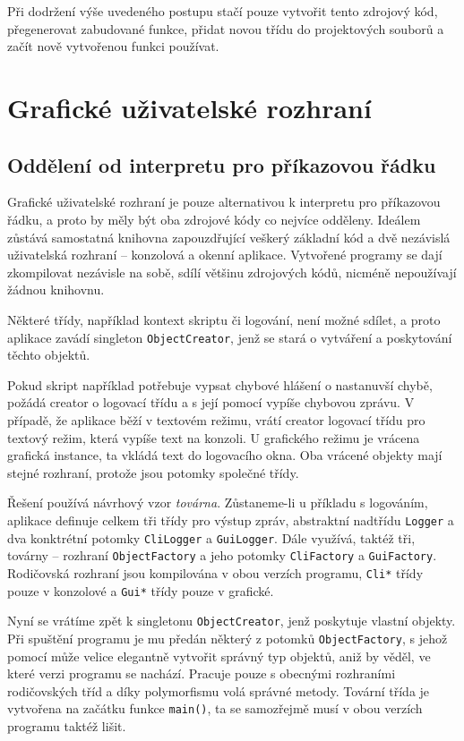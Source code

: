 \documentclass[11pt,twoside,a4paper]{book}
\begin{document}
Při dodržení výše uvedeného postupu stačí pouze vytvořit tento zdrojový kód, přegenerovat zabudované funkce, přidat novou třídu do projektových souborů a začít nově vytvořenou funkci používat.


\section{Grafické uživatelské rozhraní}

\subsection{Oddělení od interpretu pro příkazovou řádku}
\label{oddeleni_od_interpretu_pro_prikazovou_radku}

Grafické uživatelské rozhraní je pouze alternativou k interpretu pro příkazovou řádku, a proto by měly být oba zdrojové kódy co nejvíce odděleny. Ideálem zůstává samostatná knihovna zapouzdřující veškerý základní kód a dvě nezávislá uživatelská rozhraní -- konzolová a okenní aplikace. Vytvořené programy se dají zkompilovat nezávisle na sobě, sdílí většinu zdrojových kódů, nicméně nepoužívají žádnou knihovnu.

Některé třídy, například kontext skriptu či logování, není možné sdílet, a proto aplikace zavádí singleton \texttt{ObjectCreator}, jenž se stará o vytváření a poskytování těchto objektů.

Pokud skript například potřebuje vypsat chybové hlášení o nastanuvší chybě, požádá creator o logovací třídu a s její pomocí vypíše chybovou zprávu. V případě, že aplikace běží v textovém režimu, vrátí creator logovací třídu pro textový režim, která vypíše text na konzoli. U grafického režimu je vrácena grafická instance, ta vkládá text do logovacího okna. Oba vrácené objekty mají stejné rozhraní, protože jsou potomky společné třídy.

Řešení používá návrhový vzor \textit{továrna}. Zůstaneme-li u příkladu s logováním, aplikace definuje celkem tři třídy pro výstup zpráv, abstraktní nadtřídu \texttt{Logger} a dva konktrétní potomky \texttt{CliLogger} a \texttt{GuiLogger}. Dále využívá, taktéž tři, továrny -- rozhraní \texttt{ObjectFactory} a jeho potomky \texttt{CliFactory} a \texttt{GuiFactory}. Rodičovská rozhraní jsou kompilována v obou verzích programu, \texttt{Cli*} třídy pouze v konzolové a \texttt{Gui*} třídy pouze v grafické.

Nyní se vrátíme zpět k singletonu \texttt{ObjectCreator}, jenž poskytuje vlastní objekty. Při spuštění programu je mu předán některý z potomků \texttt{ObjectFactory}, s jehož pomocí může velice elegantně vytvořit správný typ objektů, aniž by věděl, ve které verzi programu se nachází. Pracuje pouze s obecnými rozhraními rodičovských tříd a díky polymorfismu volá správné metody. Tovární třída je vytvořena na začátku funkce \texttt{main()}, ta se samozřejmě musí v obou verzích programu taktéž lišit.
\end{document}
